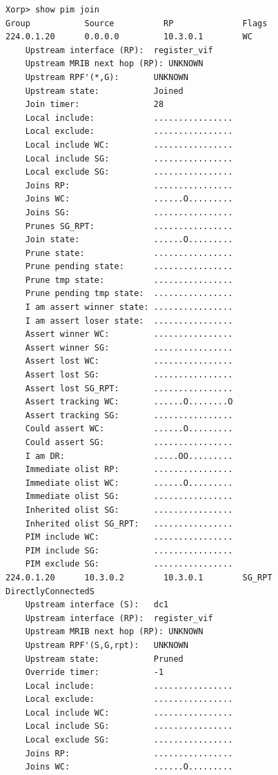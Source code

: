 \documentclass[11pt]{report}
\begin{document}
\begin{itemize}
\begin{verbatim}
Xorp> show pim join 
Group           Source          RP              Flags
224.0.1.20      0.0.0.0         10.3.0.1        WC   
    Upstream interface (RP):  register_vif
    Upstream MRIB next hop (RP): UNKNOWN
    Upstream RPF'(*,G):       UNKNOWN
    Upstream state:           Joined 
    Join timer:               28
    Local include:            ................
    Local exclude:            ................
    Local include WC:         ................
    Local include SG:         ................
    Local exclude SG:         ................
    Joins RP:                 ................
    Joins WC:                 ......O.........
    Joins SG:                 ................
    Prunes SG_RPT:            ................
    Join state:               ......O.........
    Prune state:              ................
    Prune pending state:      ................
    Prune tmp state:          ................
    Prune pending tmp state:  ................
    I am assert winner state: ................
    I am assert loser state:  ................
    Assert winner WC:         ................
    Assert winner SG:         ................
    Assert lost WC:           ................
    Assert lost SG:           ................
    Assert lost SG_RPT:       ................
    Assert tracking WC:       ......O........O
    Assert tracking SG:       ................
    Could assert WC:          ......O.........
    Could assert SG:          ................
    I am DR:                  .....OO.........
    Immediate olist RP:       ................
    Immediate olist WC:       ......O.........
    Immediate olist SG:       ................
    Inherited olist SG:       ................
    Inherited olist SG_RPT:   ................
    PIM include WC:           ................
    PIM include SG:           ................
    PIM exclude SG:           ................
224.0.1.20      10.3.0.2        10.3.0.1        SG_RPT DirectlyConnectedS 
    Upstream interface (S):   dc1
    Upstream interface (RP):  register_vif
    Upstream MRIB next hop (RP): UNKNOWN
    Upstream RPF'(S,G,rpt):   UNKNOWN
    Upstream state:           Pruned 
    Override timer:           -1
    Local include:            ................
    Local exclude:            ................
    Local include WC:         ................
    Local include SG:         ................
    Local exclude SG:         ................
    Joins RP:                 ................
    Joins WC:                 ......O.........

\end{verbatim}
\end{itemize}
\end{document}
